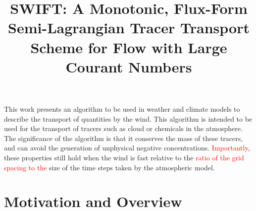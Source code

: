 \documentclass{ametsocV6.1}
\title{SWIFT: A Monotonic, Flux-Form Semi-Lagrangian Tracer Transport Scheme for Flow with Large Courant Numbers}
\affiliation{\aff{a}{Dynamics Research, Met Office, Exeter, UK}}
\newcommand{\change}[1]{\textcolor{red}{#1}}
\begin{document}
\maketitle


\statement
This work presents an algorithm to be used in weather and climate models to describe the transport of quantities by the wind.
This algorithm is intended to be used for the transport of tracers such as cloud or chemicals in the atmosphere.
The significance of the algorithm is that it conserves the mass of these tracers, and can avoid the generation of unphysical negative concentrations. \change{Importantly}, these properties still hold when the wind is fast relative to the \change{ratio of the grid spacing to the} size of the time steps taken by the atmospheric model.

%

%

\section{Motivation and Overview} \label{sec:intro}
\end{document}
